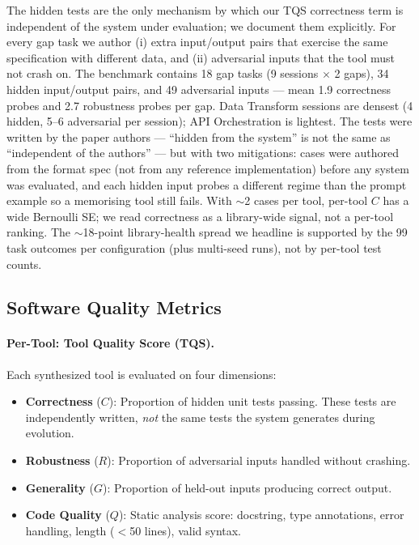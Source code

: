 \documentclass[sigconf,anonymous,review,natbib=false]{acmart}
\begin{document}
The hidden tests are the only mechanism by which our TQS correctness term is independent of the system under evaluation; we document them explicitly. For every gap task we author (i) extra input/output pairs that exercise the same specification with different data, and (ii) adversarial inputs that the tool must not crash on. The benchmark contains 18 gap tasks (9 sessions $\times$ 2 gaps), 34 hidden input/output pairs, and 49 adversarial inputs --- mean 1.9 correctness probes and 2.7 robustness probes per gap. Data Transform sessions are densest (4 hidden, 5--6 adversarial per session); API Orchestration is lightest. The tests were written by the paper authors --- ``hidden from the system'' is not the same as ``independent of the authors'' --- but with two mitigations: cases were authored from the format spec (not from any reference implementation) before any system was evaluated, and each hidden input probes a different regime than the prompt example so a memorising tool still fails. With $\sim$2 cases per tool, per-tool $C$ has a wide Bernoulli SE; we read correctness as a library-wide signal, not a per-tool ranking. The $\sim$18-point library-health spread we headline is supported by the 99 task outcomes per configuration (plus multi-seed runs), not by per-tool test counts.

\subsection{Software Quality Metrics}

\paragraph{Per-Tool: Tool Quality Score (TQS).}
Each synthesized tool is evaluated on four dimensions:

\begin{itemize}
\item \textbf{Correctness} ($C$): Proportion of hidden unit tests passing. These tests are independently written, \emph{not} the same tests the system generates during evolution.
\item \textbf{Robustness} ($R$): Proportion of adversarial inputs handled without crashing.
\item \textbf{Generality} ($G$): Proportion of held-out inputs producing correct output.
\item \textbf{Code Quality} ($Q$): Static analysis score: docstring, type annotations, error handling, length ($<$50 lines), valid syntax.
\end{itemize}
\end{document}
